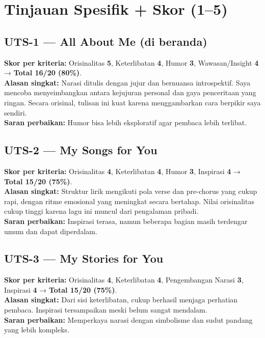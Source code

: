 \documentclass[
  letterpaper,
  DIV=11,
  numbers=noendperiod]{scrreprt}
\begin{document}
\section{Tinjauan Spesifik + Skor
(1--5)}\label{tinjauan-spesifik-skor-15}

\subsection{UTS-1 --- All About Me (di
beranda)}\label{uts-1-all-about-me-di-beranda}

\textbf{Skor per kriteria:} Orisinalitas \textbf{5}, Keterlibatan
\textbf{4}, Humor \textbf{3}, Wawasan/Insight \textbf{4} → \textbf{Total
16/20 (80\%)}.\\
\textbf{Alasan singkat:} Narasi ditulis dengan jujur dan bernuansa
introspektif. Saya mencoba menyeimbangkan antara kejujuran personal dan
gaya penceritaan yang ringan. Secara orisinal, tulisan ini kuat karena
menggambarkan cara berpikir saya sendiri.\\
\textbf{Saran perbaikan:} Humor bisa lebih eksploratif agar pembaca
lebih terlibat.

\subsection{UTS-2 --- My Songs for You}\label{uts-2-my-songs-for-you-1}

\textbf{Skor per kriteria:} Orisinalitas \textbf{4}, Keterlibatan
\textbf{4}, Humor \textbf{3}, Inspirasi \textbf{4} → \textbf{Total 15/20
(75\%)}.\\
\textbf{Alasan singkat:} Struktur lirik mengikuti pola verse dan
pre-chorus yang cukup rapi, dengan ritme emosional yang meningkat secara
bertahap. Nilai orisinalitas cukup tinggi karena lagu ini muncul dari
pengalaman pribadi.\\
\textbf{Saran perbaikan:} Inspirasi terasa, namun beberapa bagian masih
terdengar umum dan dapat diperdalam.

\subsection{UTS-3 --- My Stories for
You}\label{uts-3-my-stories-for-you-1}

\textbf{Skor per kriteria:} Orisinalitas \textbf{4}, Keterlibatan
\textbf{4}, Pengembangan Narasi \textbf{3}, Inspirasi \textbf{4} →
\textbf{Total 15/20 (75\%)}.\\
\textbf{Alasan singkat:} Dari sisi keterlibatan, cukup berhasil menjaga
perhatian pembaca. Inspirasi tersampaikan meski belum sangat mendalam.\\
\textbf{Saran perbaikan:} Memperkaya narasi dengan simbolisme dan sudut
pandang yang lebih kompleks.
\end{document}
